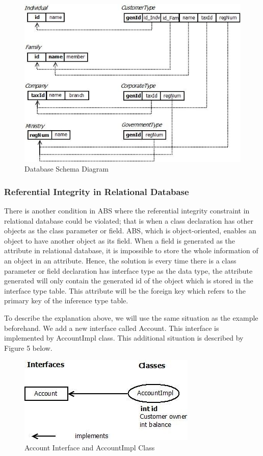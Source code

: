 \documentclass[runningheads,a4paper]{llncs}
\begin{document}
\begin{figure}
	\centering
	\includegraphics[scale=0.7]{db1.jpg}
	\caption{Database Schema Diagram}
	\label{sample}
\end{figure}

\subsubsection{Referential Integrity in Relational Database}
There is another condition in ABS where the referential integrity constraint in relational database could be violated; that is when a class declaration has other objects as the class parameter or field. ABS, which is object-oriented, enables an object to have another object as its field. When a field is generated as the attribute in relational database, it is impossible to store the whole information of an object in an attribute. Hence, the solution is every time there is a class parameter or field declaration has interface type as the data type, the attribute generated will only contain the generated id of the object which is stored in the interface type table. This attribute will be the foreign key which refers to the primary key of the inference type table.

To describe the explanation above, we will use the same situation as the example beforehand. We add a new interface called Account. This interface is implemented by AccountImpl class. This additional situation is described by Figure 5 below.

\begin{figure}
	\centering
	\includegraphics[scale=0.6]{sample2.jpg}
	\caption{Account Interface and AccountImpl Class}
	\label{sample}
\end{figure}
\end{document}
